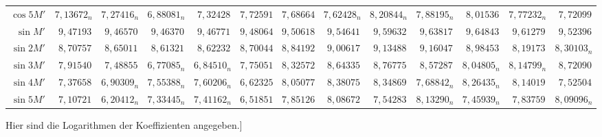 \begin{landscape}
\begin{center}
\begin{tabular}{@{}r|*{11}{r|}r@{}}
\(\cos 5M'\) & \(7{,}13672_n\) & \(7{,}27416_n\) & \(6{,}88081_n\) & \(7{,}32428\) & \(7{,}72591\) & \(7{,}68664\) & \(7{,}62428_n\) & \(8{,}20844_n\) & \(7{,}88195_n\) & \(8{,}01536\) & \(7{,}77232_n\) & \(7{,}72099\)\\[.6em]
\(\sin M'\) & \(9{,}47193\) & \(9{,}46570\) & \(9{,}46370\) & \(9{,}46771\) & \(9{,}48064\) & \(9{,}50618\) & \(9{,}54641\) & \(9{,}59632\) & \(9{,}63817\) & \(9{,}64843\) & \(9{,}61279\) & \(9{,}52396\)\\
\(\sin 2M'\) & \(8{,}70757\) & \(8{,}65011\) & \(8{,}61321\) & \(8{,}62232\) & \(8{,}70044\) & \(8{,}84192\) & \(9{,}00617\) & \(9{,}13488\) & \(9{,}16047\) & \(8{,}98453\) & \(8{,}19173\) & \(8{,}30103_n\)\\
\(\sin 3M'\) & \(7{,}91540\) & \(7{,}48855\) & \(6{,}77085_n\) & \(6{,}84510_n\) & \(7{,}75051\) & \(8{,}32572\) & \(8{,}64335\) & \(8{,}76775\) & \(8{,}57287\) & \(8{,}04805_n\) & \(8{,}14799_n\) & \(8{,}72090\)\\
\(\sin 4M'\) & \(7{,}37658\) & \(6{,}90309_n\) & \(7{,}55388_n\) & \(7{,}60206_n\) & \(6{,}62325\) & \(8{,}05077\) & \(8{,}38075\) & \(8{,}34869\) & \(7{,}68842_n\) & \(8{,}26435_n\) & \(8{,}14019\) & \(7{,}52504\)\\
\(\sin 5M'\) & \(7{,}10721\) & \(6{,}20412_n\) & \(7{,}33445_n\) & \(7{,}41162_n\) & \(6{,}51851\) & \(7{,}85126\) & \(8{,}08672\) & \(7{,}54283\) & \(8{,}13290_n\) & \(7{,}45939_n\) & \(7{,}83759\) & \(8{,}09096_n\)\\
\end{tabular}
\end{center}
\par\noindent\hspace*{\parindent}Hier sind die Logarithmen der Koeffizienten angegeben.]
\endgroup
\end{landscape}
\clearpage
\endgroup
